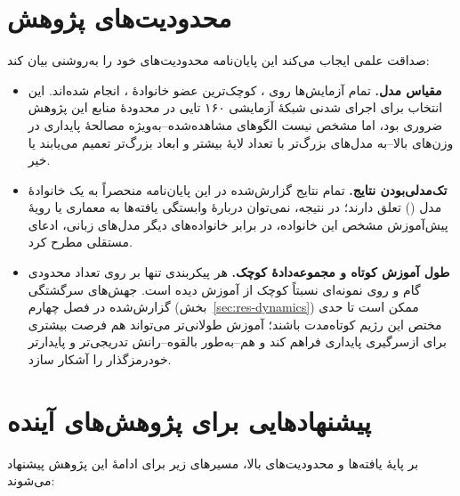 \section{محدودیت‌های پژوهش}
صداقت علمی ایجاب می‌کند این پایان‌نامه محدودیت‌های خود را به‌روشنی بیان کند:

\begin{itemize}
\item \textbf{مقیاس مدل.} تمام آزمایش‌ها روی
، کوچک‌ترین عضو خانوادهٔ
، انجام شده‌اند. این انتخاب برای اجرای شدنی شبکهٔ آزمایشی
۱۶۰
تایی در محدودهٔ منابع این پژوهش ضروری بود، اما مشخص نیست الگوهای مشاهده‌شده--به‌ویژه مصالحهٔ پایداری در وزن‌های بالا--به مدل‌های بزرگ‌تر با تعداد لایهٔ بیشتر و ابعاد بزرگ‌تر تعمیم می‌یابند یا خیر.
\item \textbf{تک‌مدلی‌بودن نتایج.} تمام نتایج گزارش‌شده در این پایان‌نامه منحصراً به یک خانوادهٔ مدل
() تعلق دارند؛ در نتیجه، نمی‌توان دربارهٔ وابستگی یافته‌ها به معماری یا رویهٔ پیش‌آموزش مشخص این خانواده، در برابر خانواده‌های دیگر مدل‌های زبانی، ادعای مستقلی مطرح کرد.
\item \textbf{طول آموزش کوتاه و مجموعه‌دادهٔ کوچک.} هر پیکربندی تنها بر روی تعداد محدودی گام و روی نمونه‌ای نسبتاً کوچک از
آموزش دیده است. جهش‌های سرگشتگی گزارش‌شده در فصل چهارم (بخش~\ref{sec:res-dynamics}) ممکن است تا حدی مختص این رژیم کوتاه‌مدت باشند؛ آموزش طولانی‌تر می‌تواند هم فرصت بیشتری برای ازسرگیری پایداری فراهم کند و هم--به‌طور بالقوه--رانش تدریجی‌تر و پایدارتر خودرمزگذار را آشکار سازد.
\end{itemize}

\section{پیشنهادهایی برای پژوهش‌های آینده}
بر پایهٔ یافته‌ها و محدودیت‌های بالا، مسیرهای زیر برای ادامهٔ این پژوهش پیشنهاد می‌شوند:

